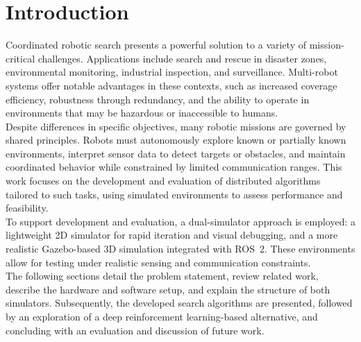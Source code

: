 \section{Introduction}
\label{sec:Introduction}



Coordinated robotic search presents a powerful solution to a variety of mission-critical challenges. Applications include search and rescue in disaster zones, environmental monitoring, industrial inspection, and surveillance. Multi-robot systems offer notable advantages in these contexts, such as increased coverage efficiency, robustness through redundancy, and the ability to operate in environments that may be hazardous or inaccessible to humans.\\

Despite differences in specific objectives, many robotic missions are governed by shared principles. Robots must autonomously explore known or partially known environments, interpret sensor data to detect targets or obstacles, and maintain coordinated behavior while constrained by limited communication ranges. This work focuses on the development and evaluation of distributed algorithms tailored to such tasks, using simulated environments to assess performance and feasibility.\\

To support development and evaluation, a dual-simulator approach is employed: a lightweight 2D simulator for rapid iteration and visual debugging, and a more realistic Gazebo-based 3D simulation integrated with ROS~2. These environments allow for testing under realistic sensing and communication constraints.\\

The following sections detail the problem statement, review related work, describe the hardware and software setup, and explain the structure of both simulators. Subsequently, the developed search algorithms are presented, followed by an exploration of a deep reinforcement learning-based alternative, and concluding with an evaluation and discussion of future work.

